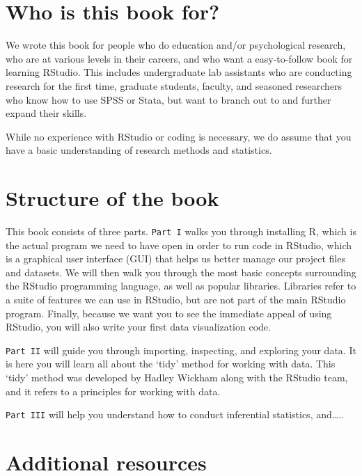 \documentclass[
]{book}
\begin{document}
\hypertarget{who-is-this-book-for}{%
\section{Who is this book for?}\label{who-is-this-book-for}}

We wrote this book for people who do education and/or psychological research, who are at various levels in their careers, and who want a easy-to-follow book for learning RStudio. This includes undergraduate lab assistants who are conducting research for the first time, graduate students, faculty, and seasoned researchers who know how to use SPSS or Stata, but want to branch out to and further expand their skills.

While no experience with RStudio or coding is necessary, we do assume that you have a basic understanding of research methods and statistics.

\hypertarget{structure-of-the-book}{%
\section{Structure of the book}\label{structure-of-the-book}}

This book consists of three parts. \texttt{Part\ I} walks you through installing R, which is the actual program we need to have open in order to run code in RStudio, which is a graphical user interface (GUI) that helps us better manage our project files and datasets. We will then walk you through the most basic concepts surrounding the RStudio programming language, as well as popular libraries. Libraries refer to a suite of features we can use in RStudio, but are not part of the main RStudio program. Finally, because we want you to see the immediate appeal of using RStudio, you will also write your first data visualization code.

\texttt{Part\ II} will guide you through importing, inspecting, and exploring your data. It is here you will learn all about the `tidy' method for working with data. This `tidy' method was developed by Hadley Wickham along with the RStudio team, and it refers to a principles for working with data.

\texttt{Part\ III} will help you understand how to conduct inferential statistics, and\ldots..

\hypertarget{additional-resources}{%
\section{Additional resources}\label{additional-resources}}
\end{document}
